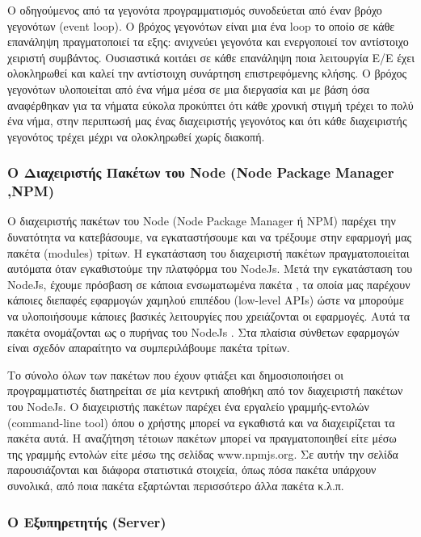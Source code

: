 		Ο οδηγούμενος από τα γεγονότα προγραμματισμός συνοδεύεται από έναν βρόχο γεγονότων (event loop). Ο βρόχος γεγονότων είναι μια ένα loop το οποίο σε κάθε επανάληψη πραγματοποιεί τα εξης: ανιχνεύει γεγονότα και ενεργοποιεί τον αντίστοιχο χειριστή συμβάντος. Ουσιαστικά κοιτάει σε κάθε επανάληψη ποια λειτουργία Ε/Ε έχει ολοκληρωθεί και καλεί την αντίστοιχη συνάρτηση επιστρεφόμενης κλήσης. Ο βρόχος γεγονότων υλοποιείται από ένα νήμα μέσα σε μια διεργασία και με βάση όσα αναφέρθηκαν για τα νήματα εύκολα προκύπτει ότι κάθε χρονική στιγμή τρέχει το πολύ ένα νήμα, στην περιπτωσή μας ένας διαχειριστής γεγονότος και ότι κάθε διαχειριστής γεγονότος τρέχει μέχρι να ολοκληρωθεί χωρίς διακοπή.
		
		\subsubsection{Ο Διαχειριστής Πακέτων του Node (Node Package Manager ,NPM)}
		

		Ο διαχειριστής πακέτων του Node (Node Package Manager ή NPM) παρέχει την δυνατότητα να κατεβάσουμε, να εγκαταστήσουμε και να τρέξουμε στην εφαρμογή μας πακέτα (modules) τρίτων. H εγκατάσταση του διαχειριστή  πακέτων πραγματοποιείται  αυτόματα όταν εγκαθιστούμε την πλατφόρμα του NodeJs. Μετά την εγκατάσταση του NodeJs, έχουμε πρόσβαση σε κάποια ενσωματωμένα πακέτα , τα οποία μας παρέχουν κάποιες διεπαφές εφαρμογών χαμηλού επιπέδου (low-level APIs) ώστε να μπορούμε να υλοποιήσουμε κάποιες βασικές λειτουργίες που χρειάζονται οι εφαρμογές. Αυτά τα πακέτα ονομάζονται ως ο πυρήνας του NodeJs . Στα πλαίσια σύνθετων εφαρμογών είναι σχεδόν απαραίτητο να συμπεριλάβουμε πακέτα τρίτων.


		Το σύνολο όλων των πακέτων που έχουν φτιάξει και δημοσιοποιήσει οι προγραμματιστές διατηρείται σε μία κεντρική αποθήκη από τον διαχειριστή πακέτων του NodeJs. Ο διαχειριστής πακέτων παρέχει ένα εργαλείο γραμμής-εντολών (command-line tool) όπου ο χρήστης μπορεί να εγκαθιστά και να διαχειρίζεται τα πακέτα αυτά. H αναζήτηση τέτοιων πακέτων μπορεί να πραγματοποιηθεί είτε  μέσω της γραμμής εντολών είτε μέσω της σελίδας www.npmjs.org. Σε αυτήν την σελίδα παρουσιάζονται και διάφορα στατιστικά στοιχεία, όπως πόσα πακέτα υπάρχουν συνολικά, από ποια πακέτα εξαρτώνται περισσότερο άλλα πακέτα κ.λ.π. \cite{cantelon}		
				
	\subsubsection{Ο Εξυπηρετητής (Server)}
	

